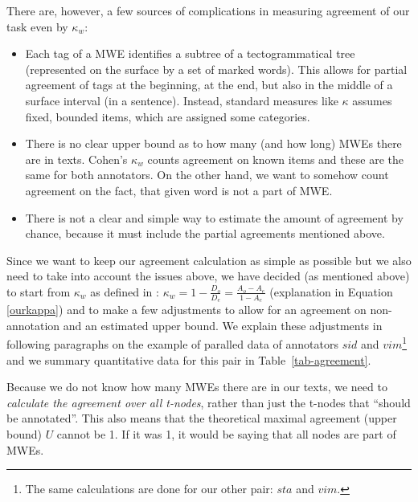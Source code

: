There are, however, a few sources of complications in measuring agreement of our task even by $\kappa_w$:
\begin{itemize}
	\item %
	Each tag of a MWE identifies a subtree of a tectogrammatical tree (represented on the surface by a set of marked words). This allows for partial agreement of tags at the beginning, at the end, but also in the middle of a surface interval (in a sentence). Instead, standard measures like $\kappa$ assumes fixed, bounded items, which are assigned some categories.
	\item %
	There is no clear upper bound as to how many (and how long) MWEs there are in texts. Cohen's $\kappa_w$ counts agreement on known items and these are the same for both annotators. On the other hand, we want to somehow count agreement on the fact, that given word is not a part of MWE.
	\item 
	There is not a clear and simple way to estimate the amount of agreement by chance, because it must include the partial agreements mentioned above.
\end{itemize}

Since we want to keep our agreement calculation as simple as possible but we also need to take into account the issues above, we have decided (as mentioned above) to start from $\kappa_w$ as defined in \cite{artstein:2007}: $\kappa_w = 1 - \frac{D_o}{D_e} = \frac{A_o - A_e}{1 - A_e}$ (explanation in Equation \ref{ourkappa}) and to make a few adjustments to allow for an agreement on non-annotation and an estimated upper bound. We explain these adjustments in following paragraphs on the example of paralled data of annotators $sid$ and $vim$\footnote{The same calculations are done for our other pair: $sta$ and $vim$.} and we summary quantitative data for this pair in Table~\ref{tab-agreement}.

Because we do not know how many MWEs there are in our texts, we need to \textit{calculate the agreement over all t-nodes}, rather than just the \mbox{t-nodes} that ``should be annotated''. This also means that the theoretical maximal agreement (upper bound) $U$ cannot be 1. If it was 1, it would be saying that all nodes are part of MWEs. 

